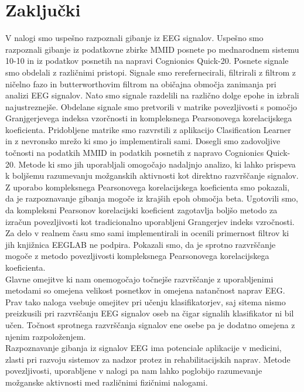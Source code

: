 \chapter{Zaključki}
V nalogi smo uspešno razpoznali gibanje iz EEG signalov. Uspešno smo razpoznali gibanje iz podatkovne zbirke MMID posnete po mednarodnem sistemu 10-10 in iz podatkov posnetih na napravi Cognionics Quick-20. Posnete signale smo obdelali z različnimi pristopi. Signale smo rerefernecirali, filtrirali z filtrom z ničelno fazo in butterworthovim filtrom na običajna območja zanimanja pri analizi EEG signalov. Nato smo signale razdelili na različno dolge epohe in izbrali najustreznejše. Obdelane signale smo pretvorili v matrike povezljivosti s pomočjo Granjgerjevega indeksa vzorčnosti in kompleksnega Pearsonovega korelacijskega koeficienta. Pridobljene matrike smo razvrstili z aplikacijo Clasification Learner in z nevronsko mrežo ki smo jo implementirali sami. Dosegli smo zadovoljive točnosti na podatkih MMID in podatkih posnetih z napravo Cognionics Quick-20. Metode ki smo jih uporabljali omogočajo nadaljnjo analizo, ki lahko prispeva k boljšemu razumevanju možganskih aktivnosti kot direktno razvrščanje signalov. Z uporabo kompleksnega Pearsonovega korelacijskega koeficienta smo pokazali, da je razpoznavanje gibanja mogoče iz krajših epoh območja beta. Ugotovili smo, da kompleksni Pearsonov korelacijski koeficient zagotavlja boljšo metodo za izračun povezljivosti kot tradicionalno uporabljeni Grangerjev indeks vzročnosti. Za delo v realnem času smo sami implementirali in ocenili primernost filtrov ki jih knjižnica EEGLAB ne podpira. Pokazali smo, da je sprotno razvrščanje mogoče z metodo povezljivosti kompleksnega Pearsonovega korelacijskega koeficienta.\\
Glavne omejitve ki nam onemogočajo točnejše razvrščanje z uporabljenimi metodami so omejena velikost posnetkov in omejena natančnost naprav EEG. Prav tako naloga vsebuje omejitev pri učenju klasifikatorjev, saj sitema nismo preizkusili pri razvrščanju EEG signalov oseb na čigar signalih klasifikator ni bil učen. Točnost sprotnega razvrščanja signalov ene osebe pa je dodatno omejena z njenim razpoloženjem.\\
Razpoznavanje gibanja iz signalov EEG ima potenciale aplikacije v medicini, zlasti pri razvoju sistemov za nadzor protez in rehabilitacijskih naprav. Metode povezljivosti, uporabljene v nalogi pa nam lahko poglobijo razumevanje možganske aktivnosti med različnimi fizičnimi nalogami.